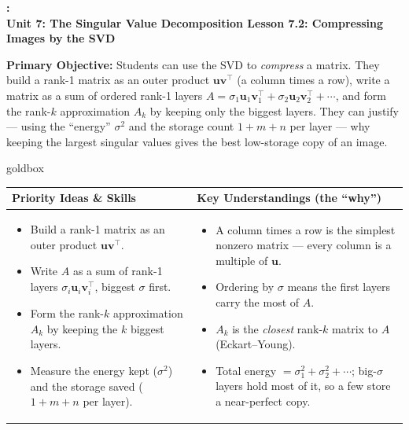 \documentclass[10pt]{article}
\newcommand{\uu}{\mathbf{u}}
\newcommand{\vv}{\mathbf{v}}
\newcommand{\T}{^{\top}}
\newcommand{\UnitNumberName}{Unit 7: The Singular Value Decomposition \quad}
\newcommand{\LessonNumberName}{Lesson 7.2: Compressing Images by the SVD}
\begin{document}
\begin{center}
    {\Large\bfseries \CourseName: \SchoolYear \\
    {\small\bfseries \UnitNumberName \LessonNumberName}}
\end{center}

\begin{tcolorbox}[colback=blush, colframe=burgundy, boxrule=0.9pt, arc=2mm,
    left=2mm, right=2mm, top=1.5mm, bottom=1.5mm]
    \textbf{Primary Objective:} Students can use the SVD to \emph{compress} a matrix. They build a rank-1
    matrix as an outer product $\uu\vv\T$ (a column times a row), write a matrix as a sum of ordered rank-1
    layers $A=\sigma_1\uu_1\vv_1\T+\sigma_2\uu_2\vv_2\T+\cdots$, and form the rank-$k$ approximation $A_k$ by
    keeping only the biggest layers. They can justify --- using the ``energy'' $\sigma^2$ and the storage
    count $1+m+n$ per layer --- why keeping the largest singular values gives the best low-storage copy of
    an image.
\end{tcolorbox}

\renewcommand{\arraystretch}{1.4}
\begin{skillbox}{goldbox}
\begin{tabularx}{\linewidth}{@{}X|X@{}}
\textbf{Priority Ideas \& Skills} & \textbf{Key Understandings (the ``why'')} \\[2pt]
\hline
\vspace{-6pt}
\begin{itemize}[leftmargin=1.1em, nosep, after=\vspace{2pt}]
  \item Build a rank-1 matrix as an outer product $\uu\vv\T$.
  \item Write $A$ as a sum of rank-1 layers $\sigma_i\uu_i\vv_i\T$, biggest $\sigma$ first.
  \item Form the rank-$k$ approximation $A_k$ by keeping the $k$ biggest layers.
  \item Measure the energy kept ($\sigma^2$) and the storage saved ($1+m+n$ per layer).
\end{itemize}
&
\vspace{-6pt}
\begin{itemize}[leftmargin=1.1em, nosep, after=\vspace{2pt}]
  \item A column times a row is the simplest nonzero matrix --- every column is a multiple of $\uu$.
  \item Ordering by $\sigma$ means the first layers carry the most of $A$.
  \item $A_k$ is the \emph{closest} rank-$k$ matrix to $A$ (Eckart--Young).
  \item Total energy $=\sigma_1^2+\sigma_2^2+\cdots$; big-$\sigma$ layers hold most of it, so a few store a near-perfect copy.
\end{itemize}
\end{tabularx}
\end{skillbox}
\end{document}

